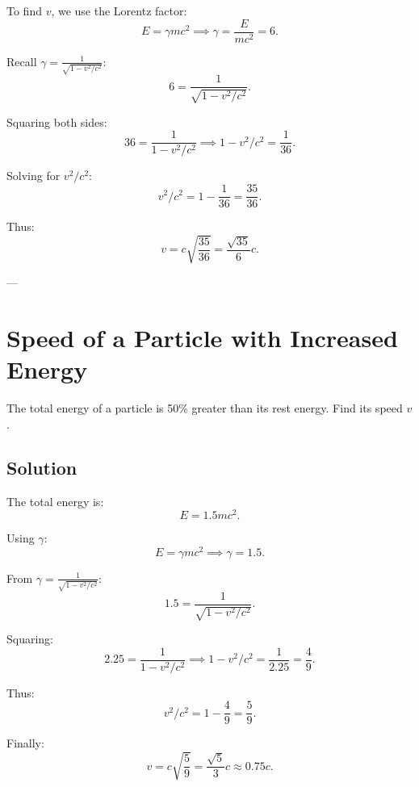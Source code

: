 \documentclass[a4paper,12pt]{article}
\begin{document}
\begin{multicols}{2}
To find $v$, we use the Lorentz factor:
\[
E = \gamma mc^2 \implies \gamma = \frac{E}{mc^2} = 6.
\]

Recall $\gamma = \frac{1}{\sqrt{1 - v^2/c^2}}$:
\[
6 = \frac{1}{\sqrt{1 - v^2/c^2}}.
\]

Squaring both sides:
\[
36 = \frac{1}{1 - v^2/c^2} \implies 1 - v^2/c^2 = \frac{1}{36}.
\]

Solving for $v^2/c^2$:
\[
v^2/c^2 = 1 - \frac{1}{36} = \frac{35}{36}.
\]

Thus:
\[
v = c \sqrt{\frac{35}{36}} = \frac{\sqrt{35}}{6}c.
\]

---

\section{Speed of a Particle with Increased Energy}
The total energy of a particle is 50\% greater than its rest energy. Find its speed $v$.

\subsection*{Solution}
The total energy is:
\[
E = 1.5mc^2.
\]

Using $\gamma$:
\[
E = \gamma mc^2 \implies \gamma = 1.5.
\]

From $\gamma = \frac{1}{\sqrt{1 - v^2/c^2}}$:
\[
1.5 = \frac{1}{\sqrt{1 - v^2/c^2}}.
\]

Squaring:
\[
2.25 = \frac{1}{1 - v^2/c^2} \implies 1 - v^2/c^2 = \frac{1}{2.25} = \frac{4}{9}.
\]

Thus:
\[
v^2/c^2 = 1 - \frac{4}{9} = \frac{5}{9}.
\]

Finally:
\[
v = c \sqrt{\frac{5}{9}} = \frac{\sqrt{5}}{3}c \approx 0.75c.
\]

\end{multicols}
\end{document}

